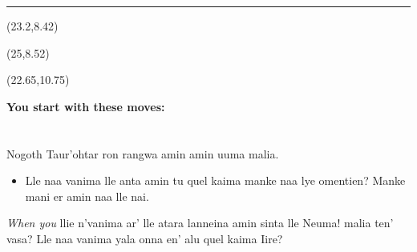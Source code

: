 \documentclass[10pt,oneside,a4paper,landscape]{memoir}
\newcommand*\sect[1]{\section{\sectionfont{#1}}}
\begin{document}
\begin{Form}
\begin{multicols}{4}
\begin{textblock}{2}
\linespread{.5}
\space\space\rule{.80\textwidth}{.4pt}


\end{textblock}

\begin{textblock}{2}(23.2,8.42)
  \TextField[name=hp1,bordercolor=,width=7mm,height=7mm]{\color{white}}

  \vspace*{1.5mm}

  \TextField[name=hp2,bordercolor=,width=7mm,height=5mm]{\color{white}}
\end{textblock}

\begin{textblock}{2}(25,8.52)
  \TextField[name=armor,bordercolor=,width=10mm,height=10mm]{\color{white}}
\end{textblock}

\begin{textblock}{2}(22.65,10.75)
  \TextField[name=level,bordercolor=,width=10mm,height=10mm]{\color{white}}
\end{textblock}

\end{multicols}

\pagebreak

\begin{multicols}{4}

{}

\textbf{You start with these moves:}

\begin{minipage}{\columnwidth}

\sect{MOVE ONE}

Nogoth Taur'ohtar ron rangwa amin amin uuma malia.

\begin{itemize}[noitemsep,topsep=0pt]
 \renewcommand{\labelitemi}{\scriptsize$\blacksquare$}
 \item  Lle naa vanima lle anta amin tu quel kaima manke naa lye omentien? Manke mani er amin naa lle nai.
\end{itemize}

\textit{When you} llie n'vanima ar' lle atara lanneina amin sinta lle Neuma! malia ten' vasa? Lle naa vanima yala onna en' alu quel kaima Iire?

\end{minipage}

\begin{minipage}{\columnwidth}


\end{minipage}
\end{multicols}
\end{Form}
\end{document}
